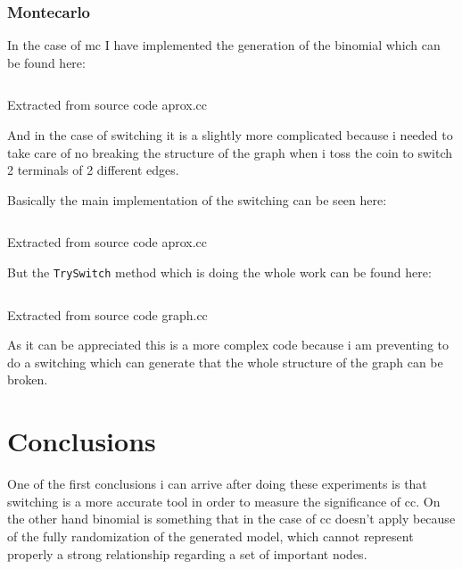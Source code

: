 \documentclass[12pt, a4paper]{article}
\begin{document}
\subsubsection{Montecarlo}
In the case of \acrshort{mc} I have implemented the generation of the \acrshort{binomial} which can be found here:

\begin{listing}[H]
    \inputminted[firstline=77, lastline=107, breaklines]{cpp}{../src/graph/aprox.cc}
    \caption{Extracted from source code aprox.cc}
    \label{source:code:4}
\end{listing} 

And in the case of \acrshort{switching} it is a slightly more complicated because i needed to take care of no breaking the 
structure of the graph when i toss the coin to switch 2 terminals of 2 different edges.

Basically the main implementation of the \acrshort{switching} can be seen here:

\begin{listing}[H]
    \inputminted[firstline=64, lastline=74, breaklines]{cpp}{../src/graph/aprox.cc}
    \caption{Extracted from source code aprox.cc}
    \label{source:code:5}
\end{listing} 

But the \texttt{TrySwitch} method which is doing the whole work can be found here:

\begin{listing}[H]
    \inputminted[firstline=280, lastline=317, breaklines]{cpp}{../src/domain/graph.cc}
    \caption{Extracted from source code graph.cc}
    \label{source:code:6}
\end{listing} 

As it can be appreciated this is a more complex code because i am preventing to do a switching which 
can generate that the whole structure of the graph can be broken.

\section{Conclusions}
One of the first conclusions i can arrive after doing these experiments is that \acrshort{switching} is a more accurate
tool in order to measure the significance of \acrshort{cc}. On the other hand \acrshort{binomial} is something that in the case
of \acrshort{cc} doesn't apply because of the fully randomization of the generated model, which cannot represent properly a strong
relationship regarding a set of important nodes. 
\end{document}
